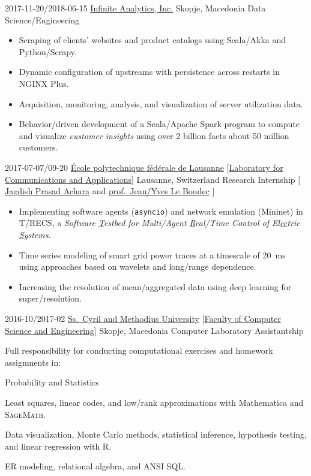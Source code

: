 \documentclass[version=last, paper=A4, DIV=12, toc=bibliography]{scrartcl}%
\begin{document}
\WorkEntry%
{2017-11-20/2018-06-15}%
{\href{http://infiniteanalytics.com/}{Infinite Analytics, Inc.}}%
{Skopje, Macedonia}%
{Data Science/Engineering}%
{%
  \begin{itemize}[noitemsep, leftmargin=*]
  \item Scraping of clients' websites and product catalogs using Scala/Akka and
    Python/Scrapy.
  \item Dynamic configuration of upstreams with persistence across restarts in
    NGINX Plus.
  \item Acquisition, monitoring, analysis, and visualization of server
    utilization data.
  \item Behavior\-/driven development of a Scala/Apache Spark program to compute
    and visualize \emph{customer insights} using over \num{2} billion facts
    about \num{50} million customers.
  \end{itemize}%
}

\WorkEntry%
{2017-07-07/09-20}%
{\href{https://epfl.ch/}{École polytechnique fédérale de Lausanne}}%
[\href{http://lca.epfl.ch/}{Laboratory for Communications and Applications}]%
{Lausanne, Switzerland}%
{Research Internship}%
[%
\href{https://people.epfl.ch/276750}{Jagdish Prasad Achara} and
\href{https://people.epfl.ch/jean-yves.leboudec}{prof.\ Jean\=/Yves Le Boudec}%
]%
{%
  \begin{itemize}[noitemsep, leftmargin=*]
  \item Implementing software agents (\texttt{asyncio}) and network
    emulation (Mininet) in T\=/RECS, a \emph{Software \underline{T}estbed for
      Multi\-/Agent \underline{R}eal\-/Time Control of El\underline{ec}tric
      \underline{S}ystems}.
  \item Time series modeling of smart grid power traces at a timescale of
    \SI{20}{\ms} using approaches based on wavelets and long\-/range dependence.
  \item Increasing the resolution of mean\-/aggregated data using deep learning
    for super\-/resolution.
  \end{itemize}%
}

\WorkEntry%
{2016-10/2017-02}%
{\href{http://ukim.edu.mk/}{Ss.\ Cyril and Methodius University}}%
[\href{https://finki.ukim.mk/}{Faculty of Computer Science and Engineering}]%
{Skopje, Macedonia}%
{Computer Laboratory Assistantship}%
{%
  Full responsibility for conducting computational exercises and homework
  assignments in:
  \begin{labeling}{Probability and Statistics}
  \item[Linear Algebra] Least squares, linear codes, and low\-/rank
    approximations with Mathematica and \textsc{SageMath}.
  \item[Probability and Statistics] Data visualization, Monte Carlo methods,
    statistical inference, hypothesis testing, and linear regression with R.
  \item[Databases] ER modeling, relational algebra, and ANSI SQL\@.
  \end{labeling}%
}
\end{document}
